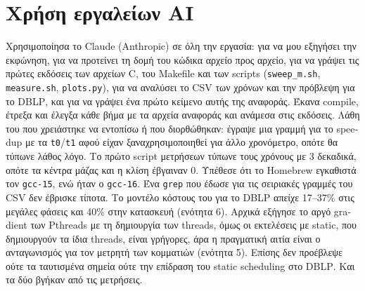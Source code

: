 \documentclass[10pt,a4paper]{article}
\newcommand{\en}[1]{\textlatin{#1}}
\let\origtexttt\texttt
\renewcommand{\texttt}[1]{\textlatin{\origtexttt{#1}}}
\begin{document}
\section{Χρήση εργαλείων \en{AI}}

Χρησιμοποίησα το \en{Claude (Anthropic)} σε όλη την εργασία: για να μου εξηγήσει την εκφώνηση, για να
προτείνει τη δομή του κώδικα αρχείο προς αρχείο, για να γράψει τις πρώτες εκδόσεις των αρχείων
\en{C}, του \en{Makefile} και των \en{scripts} (\texttt{sweep\_m.sh}, \texttt{measure.sh},
\texttt{plots.py}), για να αναλύσει το \en{CSV} των χρόνων και την πρόβλεψη για το \en{DBLP}, και
για να γράψει ένα πρώτο κείμενο αυτής της αναφοράς. Έκανα \en{compile}, έτρεξα και έλεγξα κάθε βήμα
με τα αρχεία αναφοράς και ανάμεσα στις εκδόσεις. Λάθη του που χρειάστηκε να εντοπίσω ή που
διορθώθηκαν: έγραψε μια γραμμή για το \en{speedup} με τα \texttt{t0}/\texttt{t1} αφού είχαν
ξαναχρησιμοποιηθεί για άλλο χρονόμετρο, οπότε θα τύπωνε λάθος λόγο. Το πρώτο \en{script} μετρήσεων
τύπωνε τους χρόνους με 3 δεκαδικά, οπότε τα κέντρα μάζας και η κλίση έβγαιναν 0. Υπέθεσε ότι το
\en{Homebrew} εγκαθιστά τον \texttt{gcc-15}, ενώ ήταν ο \texttt{gcc-16}. Ένα \texttt{grep} που έδωσε
για τις σειριακές γραμμές του \en{CSV} δεν έβρισκε τίποτα. Το μοντέλο κόστους του για το \en{DBLP}
απείχε 17--37\% στις μεγάλες φάσεις και 40\% στην κατασκευή (ενότητα 6). Αρχικά εξήγησε το αργό
\en{gradient} των \en{Pthreads} με τη δημιουργία των \en{threads}, όμως οι εκτελέσεις με
\en{static}, που δημιουργούν τα ίδια \en{threads}, είναι γρήγορες, άρα η πραγματική αιτία είναι ο
ανταγωνισμός για τον μετρητή των κομματιών (ενότητα 5). Επίσης δεν προέβλεψε ούτε τα ταυτισμένα
σημεία ούτε την επίδραση του \en{static scheduling} στο \en{DBLP}. Και τα δύο βγήκαν από τις
μετρήσεις.
\end{document}
